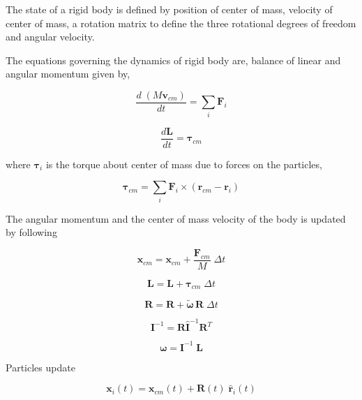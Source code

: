 \documentclass[preprint,12pt]{elsarticle}
\newcommand{\teng}[1]{\ensuremath{\boldsymbol{#1}}}
\newcommand{\ten}[1]{\ensuremath{\mathbf{#1}}}
\begin{document}
The state of a rigid body is defined by position of center of mass, velocity
of center of mass, a rotation matrix to define the three rotational degrees of
freedom and angular velocity.

The equations governing the dynamics of rigid body are, balance of linear and
angular momentum given by,

\begin{equation}
  \label{eq:balance_linear_mom}
  \frac{d \; (M \ten{v}_{cm})}{d t} = \sum_i \ten{F}_i
\end{equation}

\begin{equation}
  \label{eq:balance_angular_mom}
  \frac{d \ten{L}}{d t} = \teng{\tau}_{cm}
\end{equation}

where $\teng{\tau}_i$ is the torque about center of mass due to forces on the
particles,

\begin{equation}
  \label{eq:torque}
  \teng{\tau}_{cm} = \sum_i \ten{F}_i \times (\ten{r}_{cm} - \ten{r}_{i})
\end{equation}

The angular momentum and the center of mass velocity of the body is updated by following

\begin{equation}
  \label{eq:ang_mom_update}
  \ten{x}_{cm} = \ten{x}_{cm} + \frac{\ten{F}_{cm}}{M} \; \Delta t
\end{equation}


\begin{equation}
  \label{eq:ang_mom_update}
  \ten{L} = \ten{L} + \teng{\tau}_{cm} \; \Delta t
\end{equation}


\begin{equation}
  \label{eq:rotation_update}
  \ten{R} = \ten{R} + \tilde{\teng{\omega}} \, \ten{R} \; \Delta t
\end{equation}


\begin{equation}
  \label{eq:moi_update}
  \ten{I}^{-1} = \ten{R} \hat{\ten{I}}^{-1} \ten{R}^T
\end{equation}


\begin{equation}
  \label{eq:moi_update}
  \teng{\omega} = \ten{I}^{-1} \; \ten{L}
\end{equation}

Particles update


\begin{equation}
  \label{eq:rb_particle_pos_update}
  \ten{x}_i(t) = \ten{x}_{cm}(t) + \ten{R}(t) \; \hat{\ten{r}}_{i}(t)
\end{equation}
\end{document}
